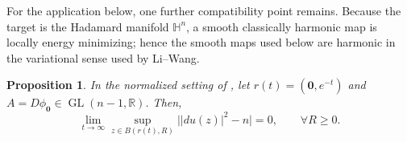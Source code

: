 \documentclass[11pt]{amsart}
\theoremstyle{plain}
\newtheorem{proposition}[theorem]{Proposition}
\theoremstyle{plain}
\theoremstyle{plain}
\newcommand{\Hn}{\mathbb H^n}
\newcommand{\R}{\mathbb R}
\numberwithin{equation}{section}
\begin{document}
For the application below, one further compatibility point remains.
Because the target is the Hadamard manifold \(\Hn\), a smooth classically
harmonic map is locally energy minimizing; hence the smooth maps used below
are harmonic in the variational sense used by Li--Wang.

\begin{proposition}\label{prop:tangent}
In the normalized setting of , let
\(r(t)=(\mathbf{0},e^{-t})\) and
\(A=D\phi_{\mathbf{0}}
\in\operatorname{GL}(n-1,\R)\).  Then, 
\begin{equation}\label{eq:sharp_tube_limit}
\lim_{t\to\infty}\sup_{z\in B(r(t),R)}\bigl||du(z)|^2-n\bigr|=0, \quad \quad \forall R\geq 0.
\end{equation}
\end{proposition}
\end{document}
